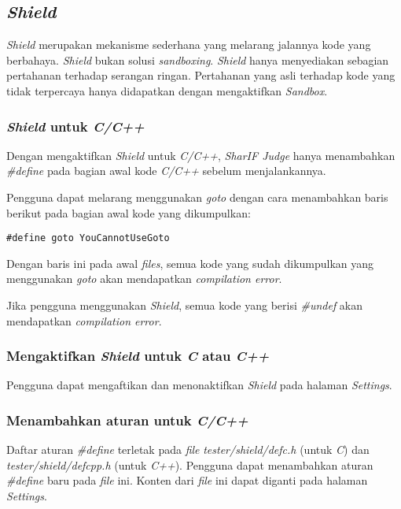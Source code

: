 \subsection{\textit{Shield}}
\label{subsubsec:shield}
\textit{Shield} merupakan mekanisme sederhana yang melarang jalannya kode yang berbahaya. \textit{Shield} bukan solusi \textit{sandboxing}. \textit{Shield} hanya menyediakan sebagian pertahanan terhadap serangan ringan. Pertahanan yang asli terhadap kode yang tidak terpercaya hanya didapatkan dengan mengaktifkan \textit{Sandbox}.

\subsubsection{\textit{Shield} untuk \textit{C/C++}}
\label{subsubsec:shield_c/c++}
Dengan mengaktifkan \textit{Shield} untuk \textit{C/C++}, \textit{SharIF Judge} hanya menambahkan \textit{\#define} pada bagian awal kode \textit{C/C++} sebelum menjalankannya.

Pengguna dapat melarang menggunakan \textit{goto} dengan cara menambahkan baris berikut pada bagian awal kode yang dikumpulkan:

\begin{lstlisting}[basicstyle=\ttfamily, frame=single,
columns=fullflexible, keepspaces=true, breaklines=true, label=ls:19]
#define goto YouCannotUseGoto
\end{lstlisting}

Dengan baris ini pada awal \textit{files}, semua kode yang sudah dikumpulkan yang menggunakan \textit{goto} akan mendapatkan \textit{compilation error}.

Jika pengguna menggunakan \textit{Shield}, semua kode yang berisi \textit{\#undef} akan mendapatkan \textit{compilation error}.

\subsubsection{Mengaktifkan \textit{Shield} untuk \textit{C} atau \textit{C++}}
\label{subsubsec:mengaktifkan_shield_c/c++}
Pengguna dapat mengaftikan dan menonaktifkan \textit{Shield} pada halaman \textit{Settings}.

\subsubsection{Menambahkan aturan untuk \textit{C/C++}}
\label{subsubsec:menambah_aturan_c/c++}
Daftar aturan \textit{\#define} terletak pada \textit{file} \textit{tester/shield/defc.h} (untuk \textit{C}) dan \textit{tester/shield/defcpp.h} (untuk \textit{C++}). Pengguna dapat menambahkan aturan \textit{\#define} baru pada \textit{file} ini. Konten dari \textit{file} ini dapat diganti pada halaman \textit{Settings}.

